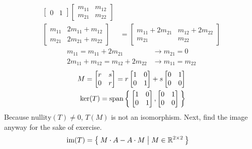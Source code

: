\documentclass[letterpaper,12pt]{article}
\begin{document}
\begin{enumerate}
\begin{align*}
\begin{bmatrix}
        0 & 1
      \end{bmatrix}
      \begin{bmatrix}
        m_{11} & m_{12} \\
        m_{21} & m_{22}
      \end{bmatrix} \\
      \begin{bmatrix}
        m_{11} & 2m_{11} + m_{12} \\
        m_{21} & 2m_{21} + m_{22}
      \end{bmatrix}
      &= \begin{bmatrix}
        m_{11} + 2m_{21} & m_{12} + 2m_{22} \\
        m_{21} & m_{22}
      \end{bmatrix}
    \end{align*}
    \begin{align*}
      m_{11} = m_{11} + 2m_{21} &\longrightarrow m_{21} = 0 \\
      2m_{11} + m_{12} = m_{12} + 2m_{22} &\longrightarrow m_{11} = m_{22}
    \end{align*}
    \begin{align*}
      M = \begin{bmatrix}
        r & s \\
        0 & r
      \end{bmatrix} =
      r\begin{bmatrix}
        1 & 0 \\
        0 & 1
      \end{bmatrix} +
      s \begin{bmatrix}
        0 & 1 \\
        0 & 0
      \end{bmatrix} \\
      \text{ker}(T) = \text{span}\Set{
        \begin{bmatrix}
          1 & 0 \\
          0 & 1
        \end{bmatrix},
        \begin{bmatrix}
          0 & 1 \\
          0 & 0
        \end{bmatrix}
      }
    \end{align*}
    Because $\text{nullity}(T) \ne 0$, $T(M)$ is not an isomorphism. Next, find the image anyway for the sake of exercise.
    \begin{align*}
      \text{im}(T) &= \Set{
        M \cdot A - A \cdot M
        | M \in \mathbb{R}^{2 \times 2}
}
\end{align*}
\end{enumerate}
\end{document}
